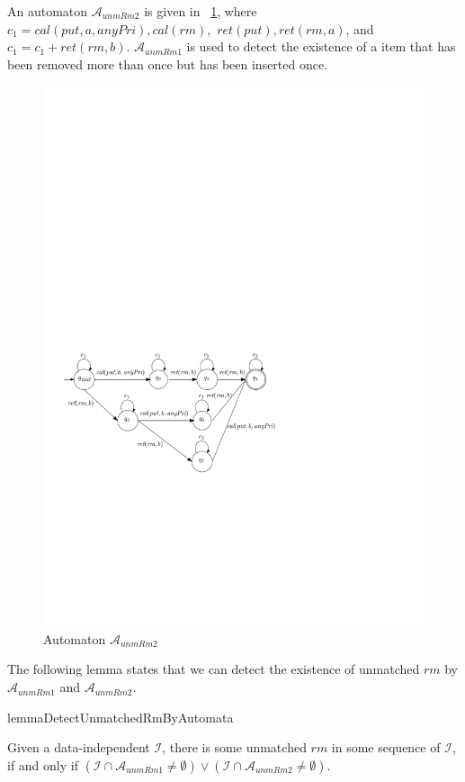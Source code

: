 An automaton $\mathcal{A}_{\textit{unmRm2}}$ is given in \figurename~\ref{fig:automata for unmatched rm2}, where $c_1 = \textit{cal}(\textit{put},a,\textit{anyPri}),\textit{cal}(rm),$ $\textit{ret}(\textit{put}),\textit{ret}(\textit{rm},a)$, and $c_1 = c_1 + \textit{ret}(\textit{rm},b)$.  $\mathcal{A}_{\textit{unmRm1}}$ is used to detect the existence of a item that has been removed more than once but has been inserted once.

\begin{figure}[htbp]
  \centering
  \includegraphics[width=0.5 \textwidth]{PIC_AUTO_UNMATCHED_RM2.pdf}
  \caption{Automaton $\mathcal{A}_{\textit{unmRm2}}$}
  \label{fig:automata for unmatched rm2}
\end{figure}



The following lemma states that we can detect the existence of unmatched $\textit{rm}$ by $\mathcal{A}_{\textit{unmRm1}}$ and $\mathcal{A}_{\textit{unmRm2}}$.

\begin{restatable}{lemma}{DetectUnmatchedRmByAutomata}
\label{lemma:detect unmatched rm by automata}

Given a data-independent $\mathcal{I}$, there is some unmatched $\textit{rm}$ in some sequence of $\mathcal{I}$, if and only if $( \mathcal{I} \cap \mathcal{A}_{\textit{unmRm1}} \neq \emptyset) \vee ( \mathcal{I} \cap \mathcal{A}_{\textit{unmRm2}} \neq \emptyset )$.
\end{restatable}

